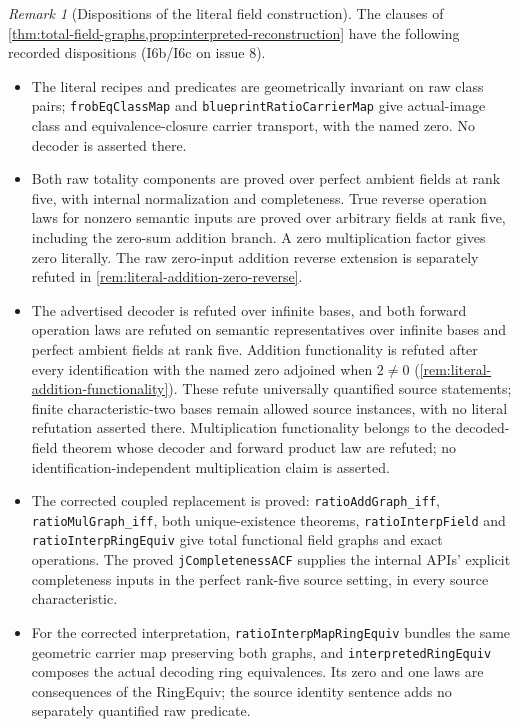 \documentclass[11pt,oneside]{article}
\theoremstyle{definition}
\theoremstyle{remark}
\newtheorem{remark}[theorem]{Remark}
\newcommand{\lean}[1]{\nolinkurl{#1}}
\begin{document}
\begin{remark}[Dispositions of the literal field construction]\label{rem:literal-m6-disposition}
The clauses of \cref{thm:total-field-graphs,prop:interpreted-reconstruction} have the
following recorded dispositions (I6b/I6c on issue 8).
\begin{itemize}
\item The literal recipes and predicates are geometrically invariant on raw class pairs;
\lean{frobEqClassMap} and \lean{blueprintRatioCarrierMap} give actual-image class and
equivalence-closure carrier transport, with the named zero. No decoder is asserted there.
\item Both raw totality components are proved over perfect ambient fields at rank five,
with internal normalization and completeness. True reverse operation laws for nonzero
semantic inputs are proved over arbitrary fields at rank five, including the zero-sum
addition branch. A zero multiplication factor gives zero literally. The raw zero-input
addition reverse extension is separately refuted in \cref{rem:literal-addition-zero-reverse}.
\item The advertised decoder is refuted over infinite bases, and both forward operation
laws are refuted on semantic representatives over infinite bases and perfect ambient
fields at rank five. Addition functionality is refuted after every identification with
the named zero adjoined when $2\ne0$ (\cref{rem:literal-addition-functionality}). These
refute universally quantified source statements; finite characteristic-two bases remain
allowed source instances, with no literal refutation asserted there. Multiplication
functionality belongs to the decoded-field theorem whose decoder and forward product law
are refuted; no identification-independent multiplication claim is asserted.
\item The corrected coupled replacement is proved: \lean{ratioAddGraph_iff},
\lean{ratioMulGraph_iff}, both unique-existence theorems, \lean{ratioInterpField} and
\lean{ratioInterpRingEquiv} give total functional field graphs and exact operations.
The proved \lean{jCompletenessACF} supplies the internal APIs' explicit completeness
inputs in the perfect rank-five source setting, in every source characteristic.
\item For the corrected interpretation, \lean{ratioInterpMapRingEquiv} bundles the same
geometric carrier map preserving both graphs, and \lean{interpretedRingEquiv} composes
the actual decoding ring equivalences. Its zero and one laws are consequences of the
RingEquiv; the source identity sentence adds no separately quantified raw predicate.

\end{itemize}
\end{remark}
\end{document}
